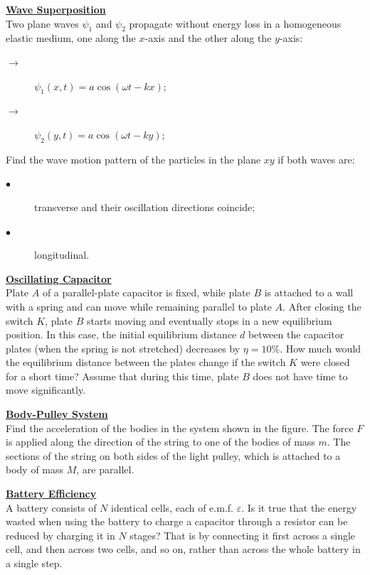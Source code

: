 \documentclass[a4paper]{article}
\begin{document}
	
	
	\Problem
	\textbf{\underline{Wave Superposition}}
	\\
	Two plane waves $\psi_1$ and $\psi_2$ propagate without energy loss in a homogeneous elastic medium, one along the $x$-axis and the other along the $y$-axis: 
	\begin{description}
		\item[$\rightarrow$] $\psi_1(x, t) = a \cos(\omega t - k x)$;
		\item[$\rightarrow$] $\psi_2(y, t) = a \cos(\omega t - k y)$;
	\end{description}
	Find the wave motion pattern of the particles in the plane $xy$ if both waves are:
	\begin{description}
		\item[$\bullet$]  transverse and their oscillation directions coincide;
		\item[$\bullet$] longitudinal.
	\end{description}
	
	\Problem
	\textbf{\underline{Oscillating Capacitor}}
	\\
	Plate $A$ of a parallel-plate capacitor is fixed, while plate $B$ is attached to a wall with a spring and can move while remaining parallel to plate $A$. After closing the switch $K$, plate $B$ starts moving and eventually stops in a new equilibrium position. In this case, the initial equilibrium distance $d$ between the capacitor plates (when the spring is not stretched) decreases by $\eta = 10\%$. How much would the equilibrium distance between the plates change if the switch $K$ were closed for a short time? Assume that during this time, plate $B$ does not have time to move significantly.
	
	
		
	\Problem
	\textbf{\underline{Body-Pulley System}}
	\\
	Find the acceleration of the bodies in the system shown in the figure. The force $F$ is applied along the direction of the string to one of the bodies of mass $m$. The sections of the string on both sides of the light pulley, which is attached to a body of mass $M$, are parallel.
	
	
	
	\Problem
	\textbf{\underline{Battery Efficiency}}
	\\
	A battery consists of $N$ identical cells, each of e.m.f. $\varepsilon$. Is it true that the energy wasted when using the battery to charge a capacitor through a resistor can be reduced by charging it in $N$ stages? That is by connecting it first across a single cell, and then across two cells, and so on, rather than across the whole battery in a single step.

	
	
	
\end{document}
